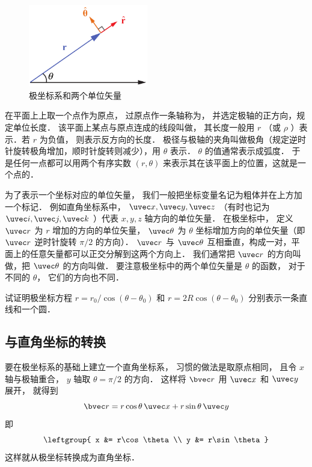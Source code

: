 
\begin{figure}[ht]
\centering
\includegraphics[width=5.2cm]{./figures/Polar1.pdf}
\caption{极坐标系和两个单位矢量}
\end{figure}

在平面上上取一个点作为原点， 过原点作一条轴称为， 并选定极轴的正方向，规定单位长度． 该平面上某点与原点连成的线段叫做， 其长度一般用 $r$ （或 $\rho$ ）表示．若 $r$ 为负值， 则表示反方向的长度． 极径与极轴的夹角叫做极角（规定逆时针旋转极角增加，顺时针旋转则减少），用 $\theta $ 表示． $\theta$ 的值通常表示成弧度． 于是任何一点都可以用两个有序实数 $(r,\theta)$ 来表示其在该平面上的位置，这就是一个点的．

为了表示一个坐标对应的单位矢量， 我们一般把坐标变量名记为粗体并在上方加一个标记． 例如直角坐标系中， $\uvec x, \uvec y, \uvec z$ （有时也记为 $\uvec i, \uvec j, \uvec k$ ）代表 $x,y,z$ 轴方向的单位矢量． 在极坐标中， 定义 $\uvec r$ 为 $r$ 增加的方向的单位矢量， $\uvec \theta$ 为 $\theta$ 坐标增加方向的单位矢量（即 $\uvec r$ 逆时针旋转 $\pi/2$ 的方向）． $\uvec r$ 与 $\uvec \theta$ 互相垂直，构成一对，平面上的任意矢量都可以正交分解到这两个方向上． 我们通常把 $\uvec r$ 的方向叫做，把 $\uvec \theta $ 的方向叫做． 要注意极坐标中的两个单位矢量是 $\theta$ 的函数， 对于不同的 $\theta$， 它们的方向也不同．

\begin{exer}{}
试证明极坐标方程 $r = r_0/\cos(\theta - \theta_0)$ 和 $r = 2R\cos(\theta - \theta_0)$ 分别表示一条直线和一个圆．
\end{exer}

\subsection{与直角坐标的转换}
要在极坐标系的基础上建立一个直角坐标系， 习惯的做法是取原点相同， 且令 $x$ 轴与极轴重合， $y$ 轴取 $\theta = \pi/2$ 的方向． 这样将 $\bvec r$ 用 $\uvec x$ 和 $\uvec y$ 展开， 就得到
\begin{equation}
\bvec r = r\cos\theta\,\uvec x + r\sin\theta\,\uvec y
\end{equation}
即
\begin{equation}\label{Polar_eq2}
\leftgroup{
x &= r\cos\theta\\
y &= r\sin\theta}
\end{equation}
这样就从极坐标转换成为直角坐标．

